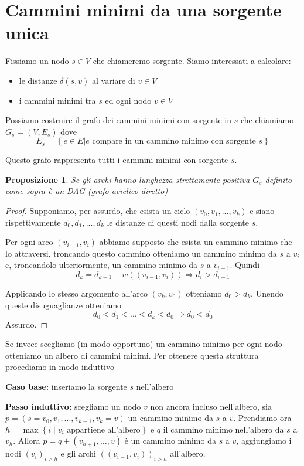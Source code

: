 \documentclass[a4paper,10pt]{amsbook}
\newcounter{counter1}
\theoremstyle{plain}
\newtheorem{mypro}[counter1]{Proposizione}
\theoremstyle{definition}
\theoremstyle{remark}
\newcommand{\set}[1]{\left\{#1\right\}}
\newcommand{\pa}[1]{\left(#1\right)}
\begin{document}
\section{Cammini minimi da una sorgente unica}

Fissiamo un nodo $s \in V$ che chiameremo sorgente. Siamo interessati
a calcolare:
\begin{itemize}
\item le distanze $\delta(s,v)$ al variare di $v\in V$
\item i cammini minimi tra $s$ ed ogni nodo $v\in V$
\end{itemize}

Possiamo costruire il grafo dei cammini minimi con sorgente in $s$ che
chiamiamo $G_s = (V,E_s)$ dove
\[ E_s = \set{ e\in E | e\text{ compare in un cammino minimo con
    sorgente }s} \]

Questo grafo rappresenta tutti i cammini minimi con sorgente $s$.

\begin{mypro}
  Se gli archi hanno lunghezza strettamente positiva $G_s$ definito
  come sopra è un DAG (grafo aciclico diretto)
\end{mypro}
\begin{proof}
  Supponiamo, per assurdo, che esista un ciclo $(v_0,v_1,...,v_k)$ e
  siano rispettivamente $d_0,d_1,...,d_k$ le distanze di questi nodi
  dalla sorgente $s$.

  Per ogni arco $(v_{i-1},v_i)$ abbiamo supposto che esista un cammino
  minimo che lo attraversi, troncando questo cammino otteniamo un
  cammino minimo da $s$ a $v_i$ e, troncandolo ulteriormente, un
  cammino minimo da $s$ a $v_{i-1}$. Quindi
  \[ d_k = d_{k-1} + w\pa{ (v_{i-1} , v_i ) } \Rightarrow d_i >
  d_{i-1} \]
  
  Applicando lo stesso argomento all'arco $(v_k,v_0)$ otteniamo $d_0 >
  d_k$. Unendo queste disuguaglianze otteniamo
  \[ d_0 < d_1 < \dots < d_k < d_0 \Rightarrow d_0 < d_0 \]
  Assurdo.
\end{proof}

Se invece scegliamo (in modo opportuno) un cammino minimo per ogni
nodo otteniamo un albero di cammini minimi. Per ottenere questa
struttura procediamo in modo induttivo

\textbf{Caso base:} inseriamo la sorgente $s$ nell'albero

\textbf{Passo induttivo:} scegliamo un nodo $v$ non ancora incluso
nell'albero, sia $\tilde p = (s=v_0,v_1,..., v_{k-1}, v_k=v)$ un cammino minimo da
$s$ a $v$. Prendiamo ora $h = \max\set{ i \mid v_i \text{ appartiene
    all'albero}}$ e $q$ il cammino minimo nell'albero da $s$ a
$v_h$. Allora $p = q + (v_{h+1}, \dots , v)$ è un cammino minimo da $s$ a
$v$, aggiungiamo i nodi $\pa{ v_i } _{i>h}$ e gli archi
  $\pa{(v_{i-1},v_i)}_{i>h}$ all'albero.
\end{document}
